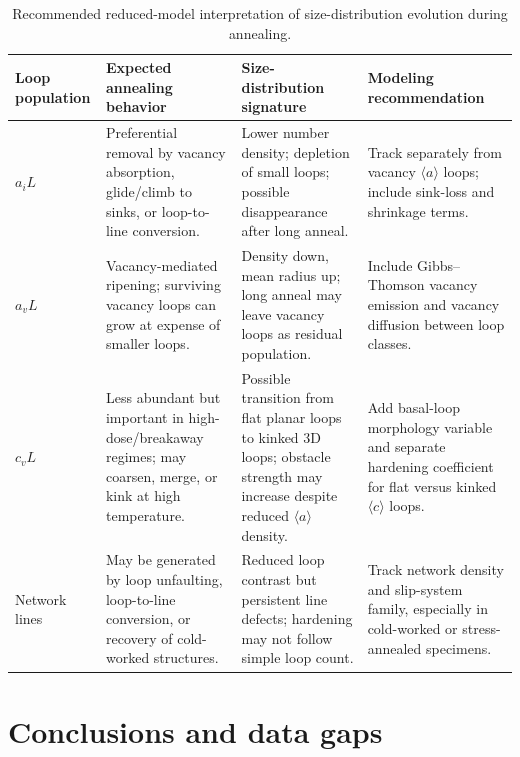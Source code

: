 \documentclass[11pt]{article}
\newcommand{\aiL}{a_iL}
\newcommand{\avL}{a_vL}
\newcommand{\cvL}{c_vL}
\begin{document}
\begin{table}[htbp]
\centering
\caption{Recommended reduced-model interpretation of size-distribution evolution during annealing.}
\label{tab:model-guidance}
\begin{tabularx}{\textwidth}{p{}YYY}
\toprule
Loop population & Expected annealing behavior & Size-distribution signature & Modeling recommendation \\
\midrule
$\aiL$ & Preferential removal by vacancy absorption, glide/climb to sinks, or loop-to-line conversion. & Lower number density; depletion of small loops; possible disappearance after long anneal. & Track separately from vacancy $\langle a\rangle$ loops; include sink-loss and shrinkage terms. \\
$\avL$ & Vacancy-mediated ripening; surviving vacancy loops can grow at expense of smaller loops. & Density down, mean radius up; long anneal may leave vacancy loops as residual population. & Include Gibbs--Thomson vacancy emission and vacancy diffusion between loop classes. \\
$\cvL$ & Less abundant but important in high-dose/breakaway regimes; may coarsen, merge, or kink at high temperature. & Possible transition from flat planar loops to kinked 3D loops; obstacle strength may increase despite reduced $\langle a\rangle$ density. & Add basal-loop morphology variable and separate hardening coefficient for flat versus kinked $\langle c\rangle$ loops. \\
Network lines & May be generated by loop unfaulting, loop-to-line conversion, or recovery of cold-worked structures. & Reduced loop contrast but persistent line defects; hardening may not follow simple loop count. & Track network density and slip-system family, especially in cold-worked or stress-annealed specimens. \\
\bottomrule
\end{tabularx}
\end{table}

\section{Conclusions and data gaps}
\end{document}
